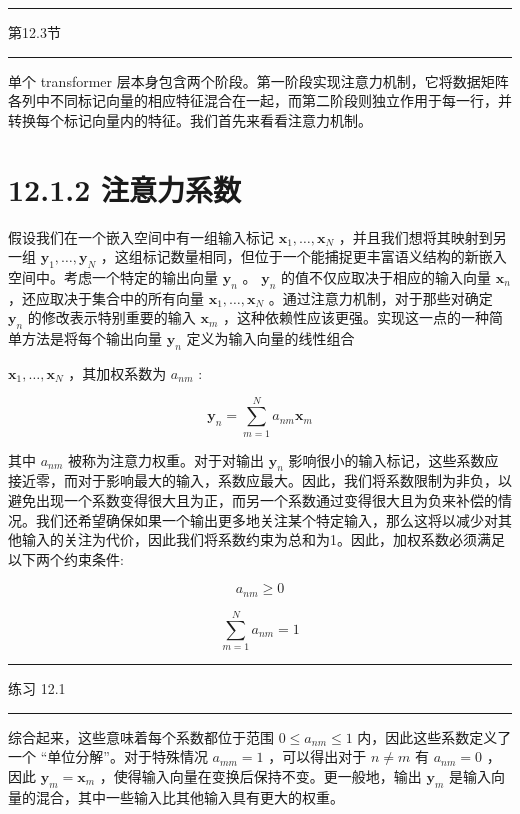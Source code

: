 \documentclass[10pt]{article}
\newcommand{\HRule}{\begin{center}\rule{0.9\linewidth}{0.2mm}\end{center}}
\begin{document}
\HRule

第12.3节

\HRule

单个 transformer 层本身包含两个阶段。第一阶段实现注意力机制，它将数据矩阵各列中不同标记向量的相应特征混合在一起，而第二阶段则独立作用于每一行，并转换每个标记向量内的特征。我们首先来看看注意力机制。

\section*{12.1.2 注意力系数}

假设我们在一个嵌入空间中有一组输入标记 \({\mathbf{x}}_{1},\ldots ,{\mathbf{x}}_{N}\) ，并且我们想将其映射到另一组 \({\mathbf{y}}_{1},\ldots ,{\mathbf{y}}_{N}\) ，这组标记数量相同，但位于一个能捕捉更丰富语义结构的新嵌入空间中。考虑一个特定的输出向量 \({\mathbf{y}}_{n}\) 。 \({\mathbf{y}}_{n}\) 的值不仅应取决于相应的输入向量 \({\mathbf{x}}_{n}\) ，还应取决于集合中的所有向量 \({\mathbf{x}}_{1},\ldots ,{\mathbf{x}}_{N}\) 。通过注意力机制，对于那些对确定 \({\mathbf{y}}_{n}\) 的修改表示特别重要的输入 \({\mathbf{x}}_{m}\) ，这种依赖性应该更强。实现这一点的一种简单方法是将每个输出向量 \({\mathbf{y}}_{n}\) 定义为输入向量的线性组合

\({\mathbf{x}}_{1},\ldots ,{\mathbf{x}}_{N}\) ，其加权系数为 \({a}_{nm}\) :

\[
{\mathbf{y}}_{n} = \mathop{\sum }\limits_{{m = 1}}^{N}{a}_{nm}{\mathbf{x}}_{m} \tag{12.2}
\]

其中 \({a}_{nm}\) 被称为注意力权重。对于对输出 \({\mathbf{y}}_{n}\) 影响很小的输入标记，这些系数应接近零，而对于影响最大的输入，系数应最大。因此，我们将系数限制为非负，以避免出现一个系数变得很大且为正，而另一个系数通过变得很大且为负来补偿的情况。我们还希望确保如果一个输出更多地关注某个特定输入，那么这将以减少对其他输入的关注为代价，因此我们将系数约束为总和为1。因此，加权系数必须满足以下两个约束条件:

\[
{a}_{nm} \geq  0 \tag{12.3}
\]

\[
\mathop{\sum }\limits_{{m = 1}}^{N}{a}_{nm} = 1 \tag{12.4}
\]

\HRule

练习 12.1

\HRule

综合起来，这些意味着每个系数都位于范围 \(0 \leq  {a}_{nm} \leq  1\) 内，因此这些系数定义了一个 “单位分解”。对于特殊情况 \({a}_{mm} = 1\) ，可以得出对于 \(n \neq  m\) 有 \({a}_{nm} = 0\) ，因此 \({\mathbf{y}}_{m} = {\mathbf{x}}_{m}\) ，使得输入向量在变换后保持不变。更一般地，输出 \({\mathbf{y}}_{m}\) 是输入向量的混合，其中一些输入比其他输入具有更大的权重。
\end{document}
